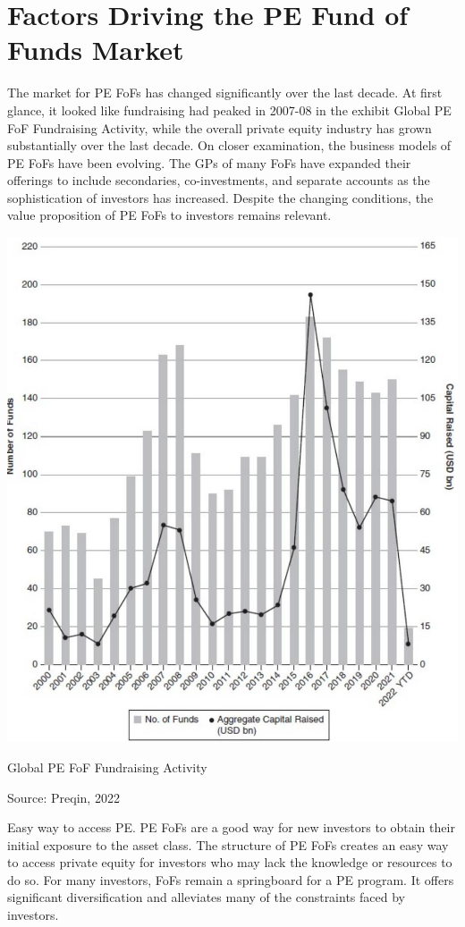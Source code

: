 \documentclass[11pt]{article}
\begin{document}
\section*{Factors Driving the PE Fund of Funds Market}
The market for PE FoFs has changed significantly over the last decade. At first glance, it looked like fundraising had peaked in 2007-08 in the exhibit Global PE FoF Fundraising Activity, while the overall private equity industry has grown substantially over the last decade. On closer examination, the business models of PE FoFs have been evolving. The GPs of many FoFs have expanded their offerings to include secondaries, co-investments, and separate accounts as the sophistication of investors has increased. Despite the changing conditions, the value proposition of PE FoFs to investors remains relevant.

\begin{center}
\includegraphics[max width=\textwidth]{2024_04_10_558733fce4b45c386018g-3}
\end{center}

Global PE FoF Fundraising Activity

Source: Preqin, 2022

Easy way to access PE. PE FoFs are a good way for new investors to obtain their initial exposure to the asset class. The structure of PE FoFs creates an easy way to access private equity for investors who may lack the knowledge or resources to do so. For many investors, FoFs remain a springboard for a PE program. It offers significant diversification and alleviates many of the constraints faced by investors.
\end{document}
